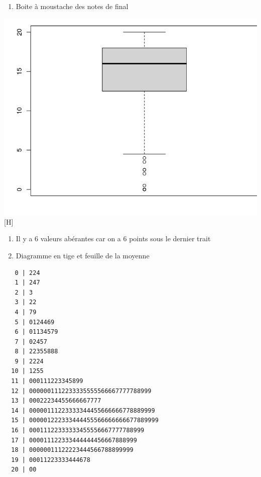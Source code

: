 \documentclass[
]{article}
\newenvironment{Shaded}{}{}
\newcommand{\KeywordTok}[1]{\textcolor[rgb]{0.00,0.44,0.13}{\textbf{#1}}}
\newcommand{\NormalTok}[1]{#1}
\newcommand{\OperatorTok}[1]{\textcolor[rgb]{0.40,0.40,0.40}{#1}}
\providecommand{\tightlist}{%
  \setlength{\itemsep}{0pt}\setlength{\parskip}{0pt}}
\begin{document}
\begin{enumerate}
\def\labelenumi{\arabic{enumi}.}
\setcounter{enumi}{21}
\tightlist
\item
  Boite à moustache des notes de final
\end{enumerate}

\begin{Shaded}
\end{Shaded}

\includegraphics{img/boxplot(final).png}[H]

\begin{enumerate}
\def\labelenumi{\arabic{enumi}.}
\setcounter{enumi}{22}
\tightlist
\item
  Il y a 6 valeurs abérantes car on a 6 points sous le dernier trait
\item
  Diagramme en tige et feuille de la moyenne
\end{enumerate}

\begin{Shaded}
\end{Shaded}

\begin{verbatim}
   0 | 224
   1 | 247
   2 | 3
   3 | 22
   4 | 79
   5 | 0124469
   6 | 01134579
   7 | 02457
   8 | 22355888
   9 | 2224
  10 | 1255
  11 | 000111223345899
  12 | 0000001112233335555566667777788999
  13 | 00022234455666667777
  14 | 00000111223333344455666666778889999
  15 | 000001222333444455566666666677889999
  16 | 00011122333333455556667777788999
  17 | 000011122333444444456667888999
  18 | 00000011122223444566788899999
  19 | 00011223333444678
  20 | 00
\end{verbatim}
\end{document}
